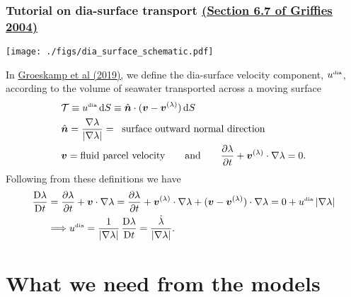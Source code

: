 \documentclass[10pt]{beamer}
\begin{document}
\begin{frame}
  \frametitle{Tutorial on dia-surface transport \href{https://press.princeton.edu/titles/7797.html}{\small (Section 6.7 of Griffies 2004)}}

\vspace{-.2cm} 
\begin{center}
{\texttt{[image: ./figs/dia\_surface\_schematic.pdf]}}
\end{center}

In
\href{https://www.annualreviews.org/doi/abs/10.1146/annurev-marine-010318-095421}{Groeskamp
  et al (2019),} we define the dia-surface velocity component,
$u^{\mbox{\tiny dia}}$, according to the volume of seawater
transported across a moving surface
\begin{align}
 &{\cal T} \equiv u^{\mbox{\tiny dia}}  \, \mathrm{d}S  \equiv \hat{\bm n} \cdot ({\bm v} - {\bm v}^{(\lambda)})  \, \mathrm{d}S
  \\
&\hat{\bm n} = \frac{\nabla \lambda}{|\nabla \lambda|}    = \; \; \mbox{surface outward normal direction} 
 \\
&{\bm v}  = \mbox{fluid parcel velocity}   \qquad \mbox{and} \qquad 
   \frac{\partial \lambda}{\partial t} +   {\bm v}^{(\lambda)} \cdot \nabla \lambda = 0.
\end{align}
 Following from these definitions we have 
\begin{align}
  \frac{\mathrm{D}\lambda}{\mathrm{D}t} 
  &= \frac{\partial \lambda}{\partial t} + {\bm v} \cdot \nabla \lambda 
 = \frac{\partial \lambda}{\partial t} + {\bm v}^{(\lambda)} \cdot \nabla \lambda  + ({\bm v} - {\bm v}^{(\lambda)}) \cdot \nabla \lambda 
= 0 + u^{\mbox{\tiny dia}} \, |\nabla \lambda| 
\\
 &\Longrightarrow u^{\mbox{\tiny dia}}  = \frac{1}{|\nabla \lambda|} \, \frac{\mathrm{D}\lambda}{\mathrm{D}t}  = \frac{\dot{\lambda}}{|\nabla \lambda|}.
\end{align}

\end{frame}



\section{What we need from the models}
\end{document}
